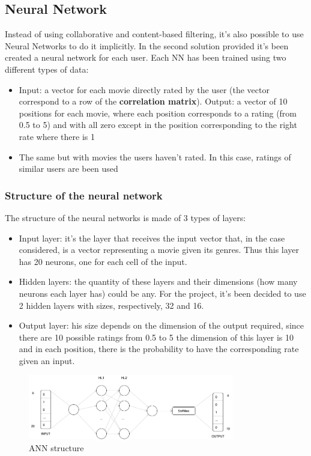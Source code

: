 \documentclass{article}
\begin{document}
\subsection{Neural Network}
Instead of using collaborative and content-based filtering, it's also possible to use Neural Networks to do it implicitly. In the second solution provided it's been created a neural network for each user. Each NN has been trained using two different types of data:

\begin{itemize}
    \item Input: a vector for each movie directly rated by the user (the vector correspond to a row of the \textbf{correlation matrix}).\newline
    Output: a vector of 10 positions for each movie, where each position corresponds to a rating (from 0.5 to 5) and with all zero except in the position corresponding to the right rate where there is 1
    \item The same but with movies the users haven't rated. In this case, ratings of similar users are been used
\end{itemize}

\subsubsection{Structure of the neural network}

The structure of the neural networks is made of 3 types of layers:
\begin{itemize}
    \item Input layer: it's the layer that receives the input vector that, in the case considered, is a vector representing a movie given its genres. Thus this layer has 20 neurons, one for each cell of the input.
    \item Hidden layers: the quantity of these layers and their dimensions (how many neurons each layer has) could be any. For the project, it's been decided to use 2 hidden layers with sizes, respectively, 32 and 16.
    \item Output layer: his size depends on the dimension of the output required, since there are 10 possible ratings from 0.5 to 5 the dimension of this layer is 10 and in each position, there is the probability to have the corresponding rate given an input.
\end{itemize}
\begin{figure}[ht]
      \begin{center}
            \includegraphics[width=0.8\textwidth]{images/ANN_img.png}
      \end{center}
      \caption{ANN structure}
      \label{fig: ANN structure}
\end{figure}
\end{document}
